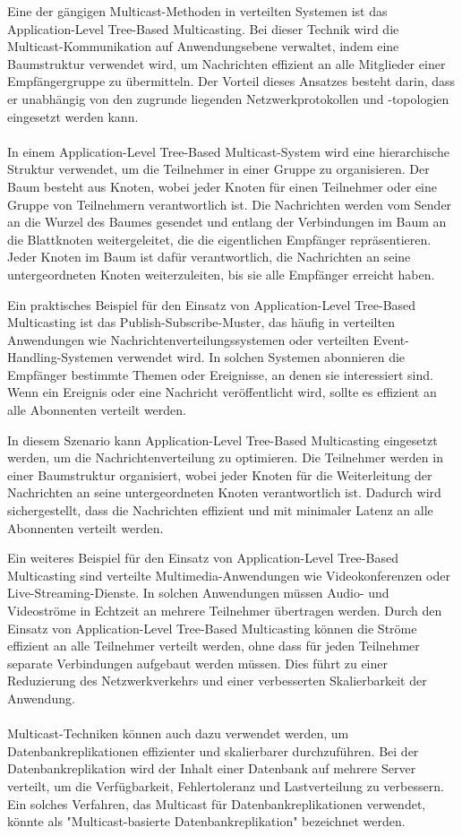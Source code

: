 \documentclass[../vs-script-first-v01.tex]{subfiles}
\begin{document}
Eine der gängigen Multicast-Methoden in verteilten Systemen ist das Application-Level Tree-Based Multicasting. Bei dieser Technik wird die Multicast-Kommunikation auf Anwendungsebene verwaltet, indem eine Baumstruktur verwendet wird, um Nachrichten effizient an alle Mitglieder einer Empfängergruppe zu übermitteln. Der Vorteil dieses Ansatzes besteht darin, dass er unabhängig von den zugrunde liegenden Netzwerkprotokollen und -topologien eingesetzt werden kann.
\\\\
In einem Application-Level Tree-Based Multicast-System wird eine hierarchische Struktur verwendet, um die Teilnehmer in einer Gruppe zu organisieren. Der Baum besteht aus Knoten, wobei jeder Knoten für einen Teilnehmer oder eine Gruppe von Teilnehmern verantwortlich ist. Die Nachrichten werden vom Sender an die Wurzel des Baumes gesendet und entlang der Verbindungen im Baum an die Blattknoten weitergeleitet, die die eigentlichen Empfänger repräsentieren. Jeder Knoten im Baum ist dafür verantwortlich, die Nachrichten an seine untergeordneten Knoten weiterzuleiten, bis sie alle Empfänger erreicht haben.

Ein praktisches Beispiel für den Einsatz von Application-Level Tree-Based Multicasting ist das Publish-Subscribe-Muster, das häufig in verteilten Anwendungen wie Nachrichtenverteilungssystemen oder verteilten Event-Handling-Systemen verwendet wird. In solchen Systemen abonnieren die Empfänger bestimmte Themen oder Ereignisse, an denen sie interessiert sind. Wenn ein Ereignis oder eine Nachricht veröffentlicht wird, sollte es effizient an alle Abonnenten verteilt werden.

In diesem Szenario kann Application-Level Tree-Based Multicasting eingesetzt werden, um die Nachrichtenverteilung zu optimieren. Die Teilnehmer werden in einer Baumstruktur organisiert, wobei jeder Knoten für die Weiterleitung der Nachrichten an seine untergeordneten Knoten verantwortlich ist. Dadurch wird sichergestellt, dass die Nachrichten effizient und mit minimaler Latenz an alle Abonnenten verteilt werden.

Ein weiteres Beispiel für den Einsatz von Application-Level Tree-Based Multicasting sind verteilte Multimedia-Anwendungen wie Videokonferenzen oder Live-Streaming-Dienste. In solchen Anwendungen müssen Audio- und Videoströme in Echtzeit an mehrere Teilnehmer übertragen werden. Durch den Einsatz von Application-Level Tree-Based Multicasting können die Ströme effizient an alle Teilnehmer verteilt werden, ohne dass für jeden Teilnehmer separate Verbindungen aufgebaut werden müssen. Dies führt zu einer Reduzierung des Netzwerkverkehrs und einer verbesserten Skalierbarkeit der Anwendung.
\\\\
Multicast-Techniken können auch dazu verwendet werden, um Datenbankreplikationen effizienter und skalierbarer durchzuführen. Bei der Datenbankreplikation wird der Inhalt einer Datenbank auf mehrere Server verteilt, um die Verfügbarkeit, Fehlertoleranz und Lastverteilung zu verbessern. Ein solches Verfahren, das Multicast für Datenbankreplikationen verwendet, könnte als "Multicast-basierte Datenbankreplikation" bezeichnet werden.
\end{document}

